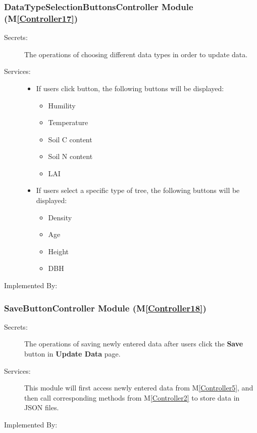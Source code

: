 \documentclass[12pt, titlepage]{article}
\newcommand{\mref}[1]{M\ref{#1}}
\begin{document}
\subsubsection{DataTypeSelectionButtonsController Module (\mref{Controller17})}
\begin{description}
\item[Secrets:] The operations of choosing different data types in order to update data.
\item[Services:]  
\begin{itemize}
\item If users click \bt button, the following buttons will be displayed:

\begin{itemize}
\item Humility
\item Temperature
\item Soil C content
\item Soil N content
\item LAI
\end{itemize}

\item If users select a specific type of tree, the following buttons will be displayed:
\begin{itemize}
\item Density
\item Age
\item Height
\item DBH
\end{itemize}

\end{itemize}
\item[Implemented By:] \progname{}
\end{description}

\renewcommand{\bt}{\textbf{Save }}
\subsubsection{SaveButtonController Module (\mref{Controller18})}
\begin{description}
\item[Secrets:] The operations of saving newly entered data after users click the \bt button
 in \textbf{Update Data} page.
\item[Services:] This module will first access newly entered data from \mref{Controller5},
and then call corresponding methods from \mref{Controller2} to store data in JSON files.
\item[Implemented By:] \progname{}
\end{description}
\end{document}
